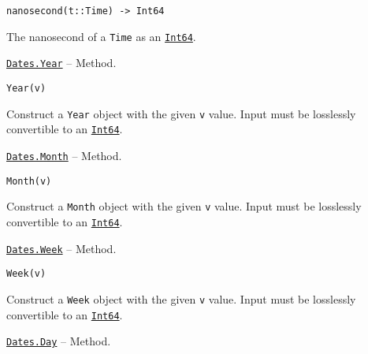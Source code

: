 \begin{adjustwidth}{2em}{0pt}


\begin{verbatim}
nanosecond(t::Time) -> Int64
\end{verbatim}

The nanosecond of a \texttt{Time} as an \hyperlink{7720564657383125058}{\texttt{Int64}}.



\end{adjustwidth}
\hypertarget{16556427820393178039}{}
\hyperlink{16556427820393178039}{\texttt{Dates.Year}}  -- {Method.}

\begin{adjustwidth}{2em}{0pt}


\begin{verbatim}
Year(v)
\end{verbatim}

Construct a \texttt{Year} object with the given \texttt{v} value. Input must be losslessly convertible to an \hyperlink{7720564657383125058}{\texttt{Int64}}.



\end{adjustwidth}
\hypertarget{2872605566119772618}{}
\hyperlink{2872605566119772618}{\texttt{Dates.Month}}  -- {Method.}

\begin{adjustwidth}{2em}{0pt}


\begin{verbatim}
Month(v)
\end{verbatim}

Construct a \texttt{Month} object with the given \texttt{v} value. Input must be losslessly convertible to an \hyperlink{7720564657383125058}{\texttt{Int64}}.



\end{adjustwidth}
\hypertarget{9656974277347347506}{}
\hyperlink{9656974277347347506}{\texttt{Dates.Week}}  -- {Method.}

\begin{adjustwidth}{2em}{0pt}


\begin{verbatim}
Week(v)
\end{verbatim}

Construct a \texttt{Week} object with the given \texttt{v} value. Input must be losslessly convertible to an \hyperlink{7720564657383125058}{\texttt{Int64}}.



\end{adjustwidth}
\hypertarget{13217464551942182596}{}
\hyperlink{13217464551942182596}{\texttt{Dates.Day}}  -- {Method.}

